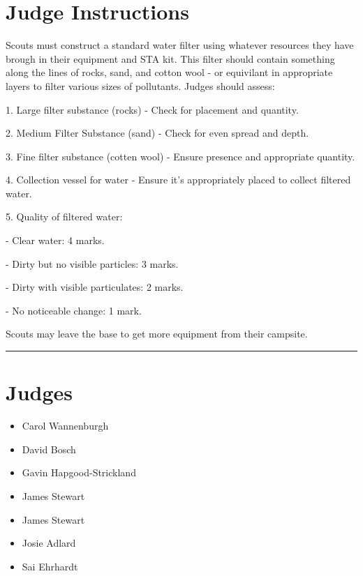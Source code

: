 \documentclass[10pt]{article}
\begin{document}
		\section*{Judge Instructions}
		Scouts must construct a standard water filter using whatever resources they have brough in their equipment and STA kit. This filter should contain something along the lines of rocks, sand, and cotton wool - or equivilant in appropriate layers to filter various sizes of pollutants. Judges should assess:



1. Large filter substance (rocks) - Check for placement and quantity.

2. Medium Filter Substance (sand) - Check for even spread and depth.

3. Fine filter substance (cotten wool) - Ensure presence and appropriate quantity.

4. Collection vessel for water - Ensure it's appropriately placed to collect filtered water.

5. Quality of filtered water:

   - Clear water: 4 marks.

   - Dirty but no visible particles: 3 marks.

   - Dirty with visible particulates: 2 marks.

   - No noticeable change: 1 mark.



Scouts may leave the base to get more equipment from their campsite.


\vspace{0.5cm}
	\hrule
	\vspace{0.5cm}
		\section*{\faUsers \: Judges}

		

	\begin{multicols}{2}

		\begin{itemize}
									\item Carol Wannenburgh
									\item David Bosch
									\item Gavin Hapgood-Strickland
									\item James Stewart
						\end{itemize}

		\vfill\null
		\columnbreak

		\begin{itemize}
									\item James Stewart
									\item Josie Adlard
									\item Sai Ehrhardt
						\end{itemize}

		\vfill\null

		\end{multicols}
\end{document}
